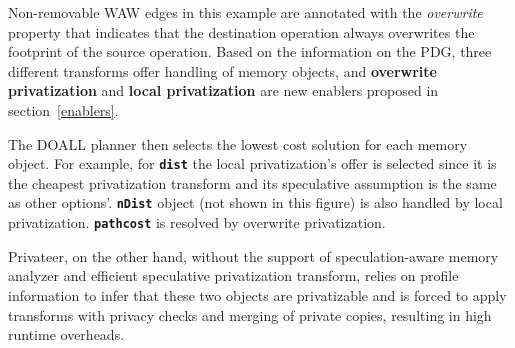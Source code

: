Non-removable WAW edges in this example are annotated with
the \textit{overwrite} property that indicates that the destination
operation always overwrites the footprint of the source operation.
%
Based on the information on the PDG, three different transforms offer
handling of memory objects, and \textbf{overwrite privatization} and
\textbf{local privatization} are new enablers proposed in
section~\ref{enablers}.

%
%
The DOALL planner then selects the lowest cost solution for each memory
object. For example, for \texttt{\textbf{dist}} the local privatization's
offer is selected since it is the cheapest privatization transform and its
speculative assumption is the same as other options'.
\texttt{\textbf{nDist}} object (not shown in this figure) is also handled
by local privatization. \texttt{\textbf{pathcost}} is resolved by overwrite
privatization.



%
Privateer, on the other hand, without the support of speculation-aware
memory analyzer and  efficient speculative privatization transform, relies
on profile information to infer that these two objects are privatizable and
is forced to apply transforms with privacy checks and merging of private
copies, resulting in high runtime overheads.

%







